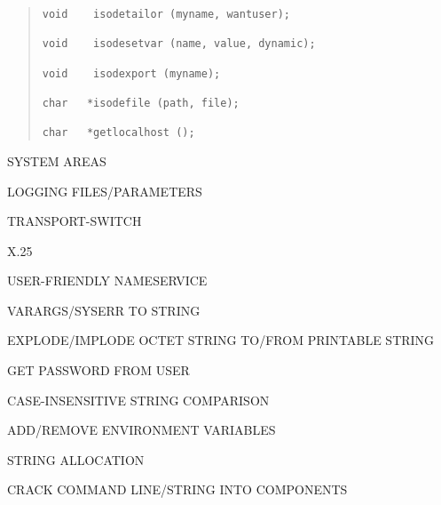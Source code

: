 \begin{bwslide}

\begin{quote}\small\begin{verbatim}
void    isodetailor (myname, wantuser);

void    isodesetvar (name, value, dynamic);

void    isodexport (myname);

char   *isodefile (path, file);

char   *getlocalhost ();
\end{verbatim}\end{quote}
\end{bwslide}


\begin{bwslide}

\begin{nrtc}
\item	SYSTEM AREAS

\item	LOGGING FILES/PARAMETERS

\item	TRANSPORT-SWITCH

\item	X.25

\item	USER-FRIENDLY NAMESERVICE
\end{nrtc}
\end{bwslide}


\begin{bwslide}

\begin{nrtc}
\item	VARARGS/SYSERR TO STRING

\item	EXPLODE/IMPLODE OCTET STRING TO/FROM PRINTABLE STRING

\item	GET PASSWORD FROM USER

\item	CASE-INSENSITIVE STRING COMPARISON

\item	ADD/REMOVE ENVIRONMENT VARIABLES

\item	STRING ALLOCATION

\item	CRACK COMMAND LINE/STRING INTO COMPONENTS
\end{nrtc}
\end{bwslide}


